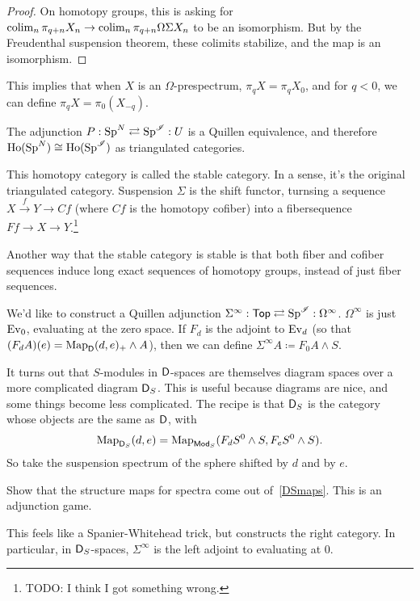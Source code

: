 \begin{proof}
On homotopy groups, this is asking for $\operatorname*{colim}_n\pi_{q+n} X_n\to\operatorname*{colim}_n\pi_{q+n}\Omega\Sigma X_n$ to be an
isomorphism. But by the Freudenthal suspension theorem, these colimits stabilize, and the map is an isomorphism.
\end{proof}
This implies that when $X$ is an $\Omega$-prespectrum, $\pi_q X = \pi_q X_0$, and for $q < 0$, we can define $\pi_q
X =\pi_0(X_{-q})$.
\begin{thm}
The adjunction $P: \mathrm{Sp}^N\rightleftarrows \mathrm{Sp}^\mathscr I: U$ is a Quillen equivalence, and therefore
$\operatorname{Ho}(\mathrm{Sp}^N)\cong\operatorname{Ho}(\mathrm{Sp}^\mathscr I)$ as triangulated categories.
\end{thm}
This homotopy category is called the stable category. In a sense, it's the original triangulated category.
Suspension $\Sigma$ is the shift functor, turnsing a sequence $X\stackrel f\to Y\to Cf$ (where $Cf$ is the homotopy
cofiber) into a fibersequence $Ff\to X\to Y$.\footnote{{\color{red}TODO}: I think I got something wrong.}

Another way that the stable category is stable is that both fiber and cofiber sequences induce long exact sequences
of homotopy groups, instead of just fiber sequences.

We'd like to construct a Quillen adjunction $\Sigma^\infty:\mathsf{Top}\rightleftarrows\mathrm{Sp}^\mathscr I: \Omega^\infty$.
$\Omega^\infty$ is just $\operatorname{Ev}_0$, evaluating at the zero space. If $F_d$ is the adjoint to $\operatorname{Ev}_d$ (so that
$(F_dA)(e) = \operatorname{Map}_\mathsf D(d, e)_+\wedge A$), then we can define $\Sigma^\infty A\coloneqq F_0A\wedge S$.

It turns out that $S$-modules in $\mathsf D$-spaces are themselves diagram spaces over a more complicated diagram
$\mathsf D_S$. This is useful because diagrams are nice, and some things become less complicated. The recipe is that
$\mathsf D_S$ is the category whose objects are the same as $\mathsf D$, with
\begin{equation}
\label{DSmaps}
\operatorname{Map}_{\mathsf D_S}(d,e) = \operatorname{Map}_{\mathsf{Mod}_S}(F_d S^0\wedge S, F_eS^0\wedge S).
\end{equation}
So take the suspension spectrum of the sphere shifted by $d$ and by $e$.
\begin{ex}
Show that the structure maps for spectra come out of~\eqref{DSmaps}. This is an adjunction game.
\end{ex}
This feels like a Spanier-Whitehead trick, but constructs the right category. In particular, in $\mathsf D_S$-spaces,
$\Sigma^\infty$ is the left adjoint to evaluating at $0$.


